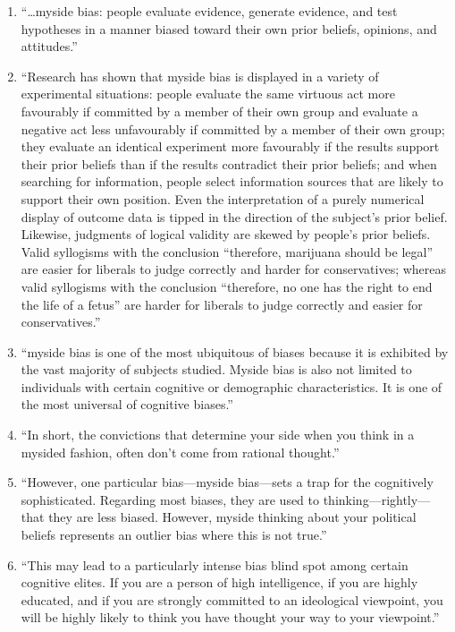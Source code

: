 \documentclass[
]{book}
\providecommand{\tightlist}{%
  \setlength{\itemsep}{0pt}\setlength{\parskip}{0pt}}
\begin{document}
\begin{enumerate}
\def\labelenumi{\arabic{enumi}.}
\tightlist
\item
  ``\ldots myside bias: people evaluate evidence, generate evidence, and test hypotheses in a manner biased toward their own prior beliefs, opinions, and attitudes.''\\
\item
  ``Research has shown that myside bias is displayed in a variety of experimental situations: people evaluate the same virtuous act more favourably if committed by a member of their own group and evaluate a negative act less unfavourably if committed by a member of their own group; they evaluate an identical experiment more favourably if the results support their prior beliefs than if the results contradict their prior beliefs; and when searching for information, people select information sources that are likely to support their own position. Even the interpretation of a purely numerical display of outcome data is tipped in the direction of the subject's prior belief. Likewise, judgments of logical validity are skewed by people's prior beliefs. Valid syllogisms with the conclusion ``therefore, marijuana should be legal'' are easier for liberals to judge correctly and harder for conservatives; whereas valid syllogisms with the conclusion ``therefore, no one has the right to end the life of a fetus'' are harder for liberals to judge correctly and easier for conservatives.''\\
\item
  ``myside bias is one of the most ubiquitous of biases because it is exhibited by the vast majority of subjects studied. Myside bias is also not limited to individuals with certain cognitive or demographic characteristics. It is one of the most universal of cognitive biases.''\\
\item
  ``In short, the convictions that determine your side when you think in a mysided fashion, often don't come from rational thought.''\\
\item
  ``However, one particular bias---myside bias---sets a trap for the cognitively sophisticated. Regarding most biases, they are used to thinking---rightly---that they are less biased. However, myside thinking about your political beliefs represents an outlier bias where this is not true.''\\
\item
  ``This may lead to a particularly intense bias blind spot among certain cognitive elites. If you are a person of high intelligence, if you are highly educated, and if you are strongly committed to an ideological viewpoint, you will be highly likely to think you have thought your way to your viewpoint.''\\

\end{enumerate}
\end{document}
